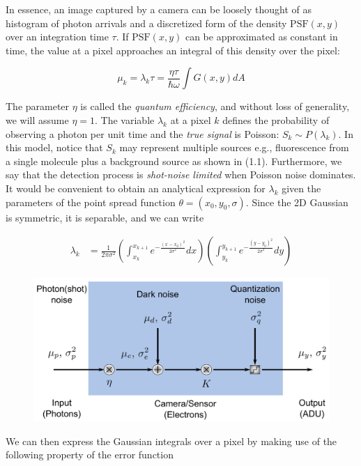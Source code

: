 \documentclass{ucetd}
\begin{document}
In essence, an image captured by a camera can be loosely thought of as histogram of photon arrivals and a discretized form of the density $\mathrm{PSF}(x,y)$ over an integration time $\tau$. If $\mathrm{PSF}(x,y)$ can be approximated as constant in time, the value at a pixel approaches an integral of this density over the pixel:

\begin{equation}
\mu_{k} = \lambda_{k}\tau = \frac{\eta\tau}{\hbar\omega}\int G(x,y)dA
\end{equation}

The parameter $\eta$ is called the \emph{quantum efficiency}, and without loss of generality, we will assume $\eta = 1$. The variable $\lambda_{k}$ at a pixel $k$ defines the probability of observing a photon per unit time and the \emph{true signal} is Poisson: $S_{k} \sim P(\lambda_{k})$. In this model, notice that $S_{k}$ may represent multiple sources e.g., fluorescence from a single molecule plus a background source as shown in (1.1). Furthermore, we say that the detection process is \emph{shot-noise limited} when Poisson noise dominates. It would be convenient to obtain an analytical expression for $\lambda_{k}$ given the parameters of the point spread function $\theta = (x_0,y_0,\sigma)$. Since the 2D Gaussian is symmetric, it is separable, and we can write

\begin{align*}
\lambda_{k} &= \frac{1}{2\pi\sigma^{2}}\left(\int_{x_{k}}^{x_{k+1}}e^{-\frac{(x-x_{0})^{2}}{2\sigma^{2}}}dx\right)\left(\int_{y_{k}}^{y_{k+1}}e^{-\frac{(y-y_{0})^{2}}{2\sigma^{2}}}dy\right)
\end{align*}

\begin{figure}[t!]
\centering
\includegraphics[width=150mm]{noise-model}
\end{figure}

We can then express the Gaussian integrals over a pixel by making use of the following property of the error function
\end{document}
